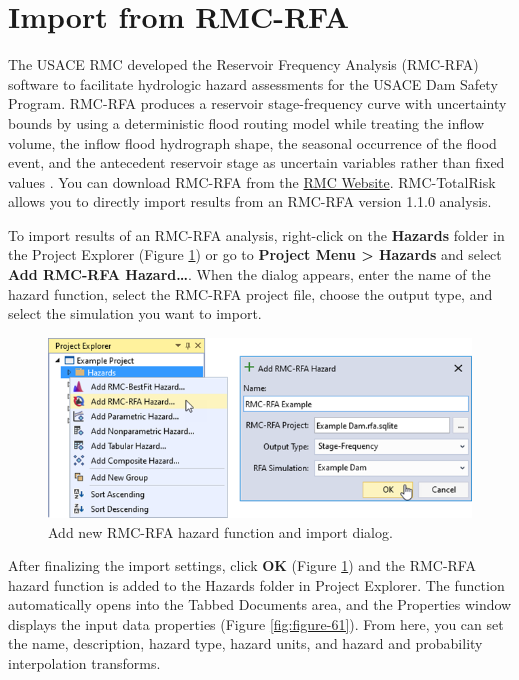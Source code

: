 \documentclass[
]{book}
\begin{document}
\hypertarget{import-from-rmc-rfa}{%
\section{Import from RMC-RFA}\label{import-from-rmc-rfa}}

The USACE RMC developed the Reservoir Frequency Analysis (RMC-RFA) software to facilitate hydrologic hazard assessments for the USACE Dam Safety Program. RMC-RFA produces a reservoir stage-frequency curve with uncertainty bounds by using a deterministic flood routing model while treating the inflow volume, the inflow flood hydrograph shape, the seasonal occurrence of the flood event, and the antecedent reservoir stage as uncertain variables rather than fixed values \citep{cite-SmithBartlesFleming}. You can download RMC-RFA from the \href{https://www.rmc.usace.army.mil/Software/RMC-RFA/}{RMC Website}. RMC-TotalRisk allows you to directly import results from an RMC-RFA version 1.1.0 analysis.

To import results of an RMC-RFA analysis, right-click on the \textbf{Hazards} folder in the Project Explorer (Figure \ref{fig:figure-60}) or go to \textbf{Project Menu \textgreater{} Hazards} and select \textbf{Add RMC-RFA Hazard\ldots{}}. When the dialog appears, enter the name of the hazard function, select the RMC-RFA project file, choose the output type, and select the simulation you want to import.

\begin{figure}

{\centering \includegraphics{images/figure60} 

}

\caption{Add new RMC-RFA hazard function and import dialog.}\label{fig:figure-60}
\end{figure}

After finalizing the import settings, click \textbf{OK} (Figure \ref{fig:figure-60}) and the RMC-RFA hazard function is added to the Hazards folder in Project Explorer. The function automatically opens into the Tabbed Documents area, and the Properties window displays the input data properties (Figure \ref{fig:figure-61}). From here, you can set the name, description, hazard type, hazard units, and hazard and probability interpolation transforms.
\end{document}
